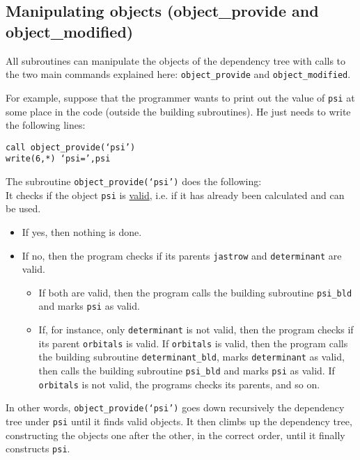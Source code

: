 \documentclass[a4paper,11pt]{article}
\newcommand\Def[1]{\underline{#1}}
\begin{document}
\subsection{Manipulating objects (object_provide and object_modified)}

All subroutines can manipulate the objects of the dependency tree with calls to the two main commands explained here: {\tt object_provide} and {\tt object_modified}.

\vspace{1em}

For example, suppose that the programmer wants to print out the value of {\tt psi} at some place in the code (outside the building subroutines). He just needs to write the following lines:

\vspace{0.5cm}
\noindent
{\tt call object_provide(`psi')\\
write(6,*) `psi=',psi}

\vspace{0.5cm}
The subroutine {\tt object_provide(`psi')} does the following:\\
It checks if the object {\tt psi} is \Def{valid}, i.e. if it has already been calculated and can be used.
\begin{itemize}
\item If yes, then nothing is done. 
\item If no, then the program checks if its parents {\tt jastrow} and {\tt determinant} are valid. 
\begin{itemize}
\item If both are valid, then the program calls the building subroutine {\tt psi_bld} and marks {\tt psi} as valid.
\item If, for instance, only {\tt determinant} is not valid, then the program checks if its parent {\tt orbitals} is valid. If {\tt orbitals} is valid, then the program calls the building subroutine {\tt determinant_bld}, marks {\tt determinant} as valid, then calls the building subroutine {\tt psi_bld} and marks {\tt psi} as valid. If {\tt orbitals} is not valid, the programs checks its parents, and so on.
\end{itemize}
\end{itemize}
In other words, {\tt object_provide(`psi')} goes down recursively the dependency tree under {\tt psi} until it finds valid objects. It then climbs up the dependency tree, constructing the objects one after the other, in the correct order, until it finally constructs {\tt psi}.
\end{document}
